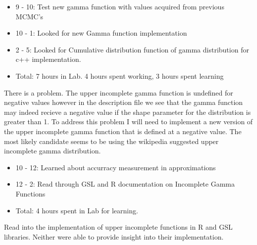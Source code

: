 \documentclass[12pt,hyperref]{labbook}
\begin{document}
\begin{itemize}
	\item 9 - 10: Test new gamma function with values acquired from previous MCMC's
	\item 10 - 1: Looked for new Gamma function implementation
	\item 2 - 5: Looked for Cumulative distribution function of gamma distribution for c++ implementation.
	\item Total: 7 hours in Lab. 4 hours spent working, 3 hours spent learning
\end{itemize}
There is a problem. The upper incomplete gamma function is undefined for negative values however in the description file we see that the gamma function may indeed recieve a negative value if the shape parameter for the distribution is greater than 1. To address this problem I will need to implement a new version of the upper incomplete gamma function that is defined at a negative value. The most likely candidate seems to be using the wikipedia suggested upper incomplete gamma distribution.

\begin{itemize}
	\item 10 - 12: Learned about accurracy measurement in approximations
	\item 12 - 2: Read through GSL and R documentation on Incomplete Gamma Functions
	\item Total: 4 hours spent in Lab for learning.
\end{itemize}
Read into the implementation of upper incomplete functions in R and GSL libraries. Neither were able to provide insight into their implementation.
\end{document}

